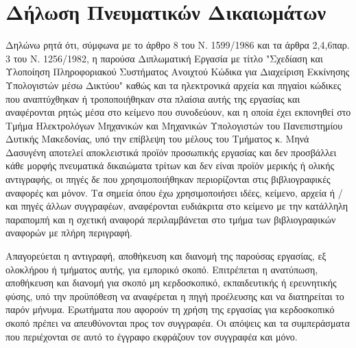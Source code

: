 \chapter*{Δήλωση Πνευματικών Δικαιωμάτων}
Δηλώνω ρητά ότι, σύμφωνα με το άρθρο 8 του Ν. 1599/1986 και τα άρθρα 2,4,6παρ. 3 του Ν. 1256/1982, η παρούσα Διπλωματική Εργασία με τίτλο "Σχεδίαση και Υλοποίηση Πληροφοριακού Συστήματος Ανοιχτού Κώδικα για Διαχείριση Εκκίνησης Υπολογιστών μέσω Δικτύου" καθώς και τα ηλεκτρονικά αρχεία και πηγαίοι κώδικες που αναπτύχθηκαν ή τροποποιήθηκαν στα πλαίσια αυτής της εργασίας και αναφέρονται ρητώς μέσα στο κείμενο που συνοδεύουν, και η οποία έχει εκπονηθεί στο Τμήμα Ηλεκτρολόγων Μηχανικών και Μηχανικών Υπολογιστών του Πανεπιστημίου Δυτικής Μακεδονίας, υπό την επίβλεψη του μέλους του Τμήματος κ. Μηνά Δασυγένη αποτελεί αποκλειστικά προϊόν προσωπικής εργασίας και δεν προσβάλλει κάθε μορφής πνευματικά δικαιώματα τρίτων και δεν είναι προϊόν μερικής ή ολικής αντιγραφής, οι πηγές δε που χρησιμοποιήθηκαν περιορίζονται στις βιβλιογραφικές αναφορές και μόνον. Τα σημεία όπου έχω χρησιμοποιήσει ιδέες, κείμενο, αρχεία ή / και πηγές άλλων συγγραφέων, αναφέρονται ευδιάκριτα στο κείμενο με την κατάλληλη παραπομπή και η σχετική αναφορά περιλαμβάνεται στο τμήμα των βιβλιογραφικών αναφορών με πλήρη περιγραφή.

Απαγορεύεται η αντιγραφή, αποθήκευση και διανομή της παρούσας εργασίας, εξ ολοκλήρου ή τμήματος αυτής, για εμπορικό σκοπό. Επιτρέπεται η ανατύπωση, αποθήκευση και διανομή για σκοπό μη κερδοσκοπικό, εκπαιδευτικής ή ερευνητικής φύσης, υπό την προϋπόθεση να αναφέρεται η πηγή προέλευσης και να διατηρείται το παρόν μήνυμα. Ερωτήματα που αφορούν τη
χρήση της εργασίας για κερδοσκοπικό σκοπό πρέπει να απευθύνονται προς τον συγγραφέα. Οι απόψεις και τα συμπεράσματα που περιέχονται σε αυτό το έγγραφο εκφράζουν τον συγγραφέα και μόνο.

\vfill

\begin{center}
\end{center}
